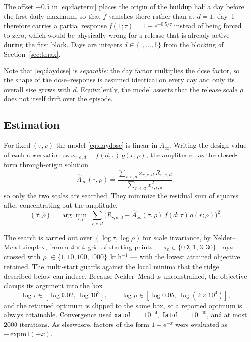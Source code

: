 \documentclass[11pt]{article}
\begin{document}
The offset $-0.5$ in \eqref{eq:dayterm} places the origin of the buildup half a day
before the first daily maximum, so that $f$ vanishes there rather than at $d=1$;
day~1 therefore carries a partial response $f(1;\tau)=1-e^{-0.5/\tau}$ instead of
being forced to zero, which would be physically wrong for a release that is already
active during the first block. Days are integers $d\in\{1,\dots,5\}$ from the
blocking of Section~\ref{sec:tmax}.

Note that \eqref{eq:daydose} is \emph{separable}: the day factor multiplies the
dose factor, so the shape of the dose--response is assumed identical on every day
and only its overall size grows with $d$. Equivalently, the model asserts that the
release scale $\rho$ does not itself drift over the episode.

\subsection{Estimation}

For fixed $(\tau,\rho)$ the model \eqref{eq:daydose} is linear in $A_\infty$.
Writing the design value of each observation as
$x_{r,e,d}=f(d;\tau)\,g(r;\rho)$, the amplitude has the closed-form through-origin
solution
\begin{equation}
  \widehat{A}_\infty(\tau,\rho)
  = \frac{\sum_{r,e,d} x_{r,e,d}\, R_{r,e,d}}{\sum_{r,e,d} x_{r,e,d}^{2}},
  \label{eq:amp_joint}
\end{equation}
so only the two scales are searched. They minimize the residual sum of squares
after concentrating out the amplitude,
\begin{equation}
  (\widehat{\tau},\widehat{\rho})
  = \arg\min_{\tau,\rho}\;
    \sum_{r,e,d}\Big(R_{r,e,d} - \widehat{A}_\infty(\tau,\rho)\,f(d;\tau)\,g(r;\rho)\Big)^2 .
  \label{eq:profile_joint}
\end{equation}

The search is carried out over $(\log\tau,\log\rho)$ for scale invariance, by
Nelder--Mead simplex, from a $4\times4$ grid of starting points --- $\tau_0 \in
\{0.3, 1, 3, 30\}$~days crossed with $\rho_0 \in \{1, 10, 100, 1000\}$~kt\,h$^{-1}$
--- with the lowest attained objective retained. The multi-start guards against the
local minima that the ridge described below can induce. Because Nelder--Mead is
unconstrained, the objective clamps its argument into the box
\begin{equation}
  \log\tau \in [\log 0.02,\ \log 10^{3}], \qquad
  \log\rho \in [\log 0.05,\ \log(2\times10^{4})],
\end{equation}
and the returned optimum is clipped to the same box, so a reported optimum is
always attainable. Convergence used \texttt{xatol}~$=10^{-4}$,
\texttt{fatol}~$=10^{-10}$, and at most $2000$ iterations. As elsewhere, factors of
the form $1-e^{-x}$ were evaluated as $-\,\mathrm{expm1}(-x)$.
\end{document}
